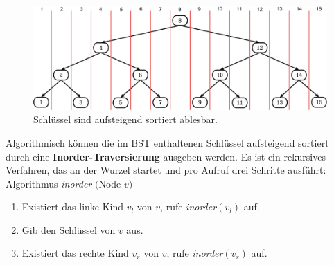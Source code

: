 \documentclass[a4paper,12pt]{article}
\begin{document}
\begin{figure}[H]
	\centering
	\includegraphics[width= 1\textwidth]{Medien/Einleitung/linksRechts}
	\caption{Schlüssel sind aufsteigend sortiert ablesbar. }
	\label{fig:linksRechts}
\end{figure}
\noindent Algorithmisch können die im BST enthaltenen Schlüssel aufsteigend sortiert durch eine \textbf{Inorder-Traversierung} ausgeben werden. Es ist ein rekursives Verfahren, das an der Wurzel startet und pro Aufruf drei Schritte ausführt:\\

Algorithmus \textit{inorder} $($Node $v)$
\begin{enumerate}
	\item Existiert das linke Kind $v_l$ von $v$, rufe \textit{inorder}$\left(v_l\right)$ auf. 
	\item Gib den Schlüssel von $v$ aus. 
	\item Existiert das rechte Kind $v_r$ von $v$, rufe  \textit{inorder}$\left(v_r\right)$  auf. 
\end{enumerate}
\end{document}
